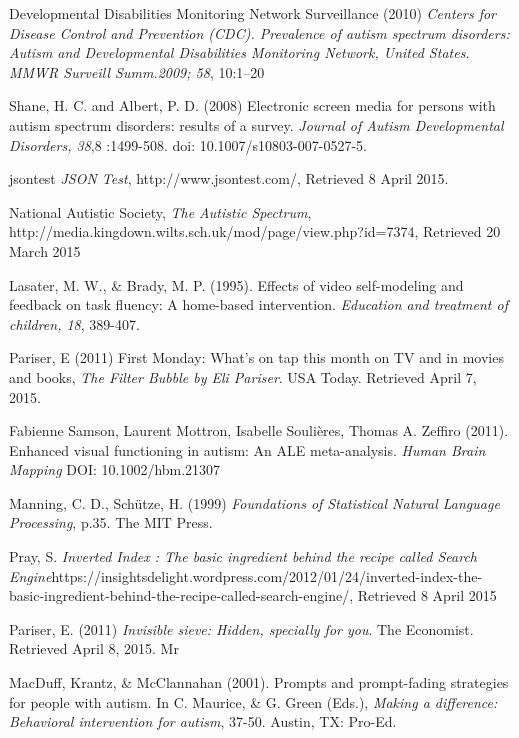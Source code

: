\documentclass[a4paper, 10pt]{article}
\begin{document}
\begin{thebibliography}{100}
Developmental Disabilities Monitoring Network Surveillance (2010) \textit{Centers for Disease Control and Prevention (CDC). Prevalence of autism spectrum disorders: Autism and Developmental Disabilities Monitoring Network, United States. MMWR Surveill Summ.2009; 58}, 10:1–20


Shane, H. C. and Albert, P. D. (2008) Electronic screen media for persons with autism spectrum disorders: results of a survey. \textit{Journal of Autism Developmental Disorders, 38},8 :1499-508. doi: 10.1007/s10803-007-0527-5.

jsontest \textit{JSON Test}, http://www.jsontest.com/, Retrieved 8 April 2015.

National Autistic Society, \textit{The Autistic Spectrum}, \\http://media.kingdown.wilts.sch.uk/mod/page/view.php?id=7374, Retrieved 20 March 2015

Lasater, M. W., \& Brady, M. P. (1995). Effects of video self-modeling and feedback on task fluency: A home-based intervention. \textit{Education and treatment of children, 18}, 389-407.

 Pariser, E (2011) First Monday: What's on tap this month on TV and in movies and books, \textit{The Filter Bubble by Eli Pariser}. USA Today. Retrieved April 7, 2015. 

Fabienne Samson, Laurent Mottron, Isabelle Soulières, Thomas A. Zeffiro (2011). Enhanced visual functioning in autism: An ALE meta-analysis. \textit{Human Brain Mapping} DOI: 10.1002/hbm.21307

Manning, C. D., Schütze, H. (1999) \textit{Foundations of Statistical Natural Language Processing}, p.35. The MIT Press.

 Pray, S. \textit{Inverted Index : The basic ingredient behind the recipe called Search Engine}https://insightsdelight.wordpress.com/2012/01/24/inverted-index-the-basic-ingredient-behind-the-recipe-called-search-engine/, Retrieved 8 April 2015

 Pariser, E. (2011) \textit{Invisible sieve: Hidden, specially for you}. The Economist. Retrieved April 8, 2015. Mr 

 MacDuff, Krantz, \& McClannahan (2001). Prompts and prompt-fading strategies for people with autism. In C. Maurice, \& G. Green (Eds.), \textit{Making a difference: Behavioral intervention for autism}, 37-50. Austin, TX: Pro-Ed.


\end{thebibliography}
\end{document}
